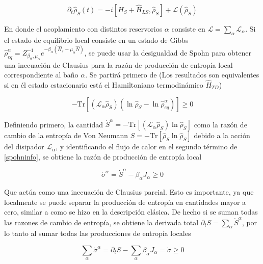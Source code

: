 \begin{equation*}
    \partial_{t}\hat{\rho}_{S}(t) = - i[\hat{H}_{S} + \hat{H}_{LS},\hat{\rho}_{S}] + \mathcal{L}(\hat{\rho}_{S})
\end{equation*}

En donde el acoplamiento con distintos reservorios $\alpha$ consiste en $\mathcal{L} = \sum_{\alpha}\mathcal{L}_{\alpha}$. Si el estado de equilibrio local consiste en un estado de Gibbs $\hat{\rho}_{eq}^{\alpha} = Z_{\beta_{\alpha},\mu_{\alpha}}^{-1}e^{-\beta_{\alpha}(\hat{H}_{s} - \mu_{\alpha}\hat{N})}$, se puede usar la desigualdad de Spohn \cite{spohn1978entropy} para  obtener una inecuación de Clausius para la razón de producción de entropía local correspondiente al baño $\alpha$. Se partirá primero de (Los resultados son equivalentes si en él estado estacionario está el Hamiltoniano termodinámico $\hat{H}_{TD}$)

\begin{equation}
    - \text{Tr}[ (\mathcal{L}_{\alpha} \hat{\rho}_{S})(\ln \hat{\rho}_{S} - \ln \hat{\rho}^{\alpha}_{eq} )  ] \geq 0
\label{spohninfo}
\end{equation}

Definiendo primero, la cantidad $\dot{S}^{\alpha} = - \text{Tr}[(\mathcal{L}_{\alpha}\hat{\rho}_{S}) \ln \hat{\rho}_{S} ]$ como la razón de cambio de la entropía de Von Neumann $S = - \text{Tr}[\hat{\rho}_{S} \ln \hat{\rho}_{S} ]$ debido a la acción del disipador $\mathcal{L}_{\alpha}$, y identificando el flujo de calor en el segundo término de \ref{spohninfo}, se obtiene la razón de producción de entropía local

\begin{equation}
    \dot{\sigma}^{\alpha} = \dot{S}^{\alpha} - \beta_{\alpha} J_{\alpha} \geq 0
\label{sec4:localentropy}
\end{equation}

Que actúa como una inecuación de Clausius parcial. Esto es importante, ya que localmente se puede separar la producción de entropía en cantidades mayor a cero, similar a como se hizo en la descripción clásica. De hecho si se suman todas las razones de cambio de entropía, se obtiene la derivada total $\partial_{t} S = \sum_{\alpha} \dot{S}^{\alpha}$, por lo tanto al sumar todas las producciones de entropía locales

\begin{equation*}
    \sum_{\alpha}\dot{\sigma}^{\alpha} = \partial_{t}S - \sum_{\alpha}\beta_{\alpha}J_{\alpha} = \dot{\sigma} \geq 0
\end{equation*}

